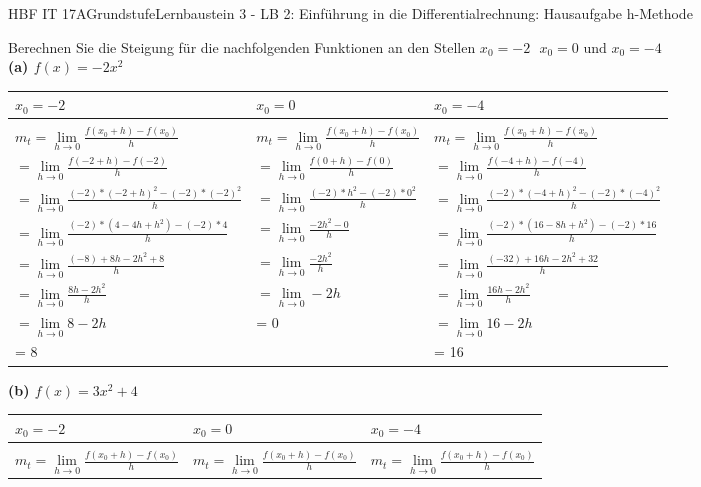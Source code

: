 \documentclass[oneside,openany,headings=optiontotoc,11pt,numbers=noenddot]{scrreprt}
\begin{document}
	\begin{worksheet}{HBF IT 17A}{Grundstufe}{Lernbaustein 3 - LB 2: Einführung in die Differentialrechnung: Hausaufgabe h-Methode}

		\begin{framed}
			\noindent
			\normalsize
			Berechnen Sie die Steigung für die nachfolgenden Funktionen an den Stellen \(x_0 = -2 \text{ }x_0=0 \text{ und } x_0=-4\)\\
			\textbf{(a) \(f(x) = -2x^{2}\)}\\
			\begin{tabularx}{\textwidth}{X|X|X}
				\(x_0 = -2\) & \(x_0 = 0\) & \(x_0=-4\)\\
				\hline
				\\
				\(m_{t} = \lim\limits_{h \to 0} \frac{f(x_{0}+h) - f(x_0)}{h}\) & \(m_{t} = \lim\limits_{h \to 0} \frac{f(x_{0}+h) - f(x_0)}{h}\) & \(m_{t} = \lim\limits_{h \to 0} \frac{f(x_{0}+h) - f(x_0)}{h}\)\\
				\(=\lim\limits_{h \to 0} \frac{f(-2+h)-f(-2)}{h}\) & \(=\lim\limits_{h \to 0} \frac{f(0+h)-f(0)}{h}\) & \(=\lim\limits_{h \to 0} \frac{f(-4+h)-f(-4)}{h}\)\\
				\(=\lim\limits_{h \to 0} \frac{(-2)*(-2+h)^2 - (-2)*(-2)^2}{h}\) & \(=\lim\limits_{h \to 0} \frac{(-2)*h^2 - (-2)*0^2}{h}\) & \(=\lim\limits_{h \to 0} \frac{(-2)*(-4+h)^2 - (-2)*(-4)^2}{h}\)\\
				\(=\lim\limits_{h \to 0} \frac{(-2)*(4 -4h+h^2) -(-2)*4}{h}\) & \(=\lim\limits_{h \to 0} \frac{-2h^2 - 0}{h}\) & \(=\lim\limits_{h \to 0} \frac{(-2)*(16-8h+h^2) -(-2)*16}{h}\)\\
				\(=\lim\limits_{h \to 0}\frac{(-8)+8h-2h^2 +8}{h}\) & \(=\lim\limits_{h \to 0}\frac{-2h^2}{h}\) & \(=\lim\limits_{h \to 0}\frac{(-32)+16h-2h^2 +32}{h}\)\\
				\(=\lim\limits_{h \to 0} \frac{8h -2h^2}{h}\) & \(=\lim\limits_{h \to 0}-2h\) & \(=\lim\limits_{h \to 0} \frac{16h -2h^2}{h}\)\\
				\(=\lim\limits_{h \to 0} 8 -2h\) & = 0 & \(=\lim\limits_{h \to 0} 16 -2h\)\\
				= 8 & & = 16
			\end{tabularx}
			\textbf{(b) \(f(x) = 3x^2 + 4\)}\\
			\begin{tabularx}{\textwidth}{X|X|X}
				\(x_0 = -2\) & \(x_0 = 0\) & \(x_0=-4\)\\
				\hline
				\\
				\(m_{t} = \lim\limits_{h \to 0} \frac{f(x_{0}+h) - f(x_0)}{h}\) & \(m_{t} = \lim\limits_{h \to 0} \frac{f(x_{0}+h) - f(x_0)}{h}\) & \(m_{t} = \lim\limits_{h \to 0} \frac{f(x_{0}+h) - f(x_0)}{h}\)\\

\end{tabularx}
\end{framed}
\end{worksheet}
\end{document}
